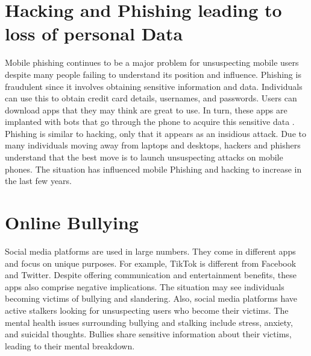 \documentclass{article}
\begin{document}
\section*{Hacking and Phishing leading to loss of personal Data}
Mobile phishing continues to be a major problem for unsuspecting mobile users despite many people failing to understand its position and influence. Phishing is fraudulent since it involves obtaining sensitive information and data. Individuals can use this to obtain credit card details, usernames, and passwords. Users can download apps that they may think are great to use. In turn, these apps are implanted with bots that go through the phone to acquire this sensitive data \cite{Leguesse20}. Phishing is similar to hacking, only that it appears as an insidious attack. Due to many individuals moving away from laptops and desktops, hackers and phishers understand that the best move is to launch unsuspecting attacks on mobile phones. The situation has influenced mobile Phishing and hacking to increase in the last few years.

\medskip

\section*{Online Bullying}
Social media platforms are used in large numbers. They come in different apps and focus on unique purposes. For example, TikTok is different from Facebook and Twitter. Despite offering communication and entertainment benefits, these apps also comprise negative implications. The situation may see individuals becoming victims of bullying and slandering. Also, social media platforms have active stalkers looking for unsuspecting users who become their victims. The mental health issues surrounding bullying and stalking include stress, anxiety, and suicidal thoughts. Bullies share sensitive information about their victims, leading to their mental breakdown. 

\medskip
\end{document}
